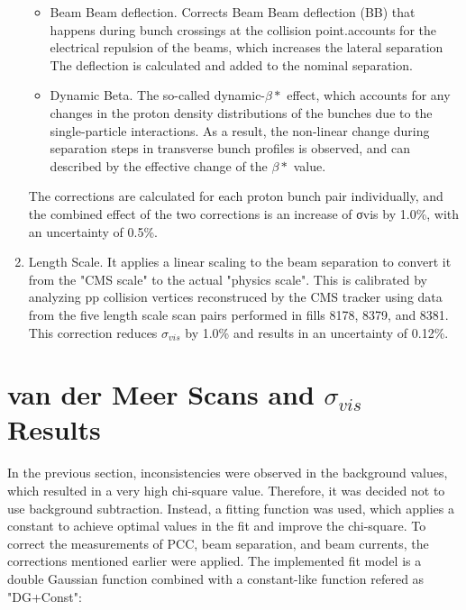 \begin{enumerate}
\begin{itemize}
\item Beam Beam deflection. Corrects Beam Beam deflection (BB) that happens during bunch crossings at the collision point.accounts for the electrical repulsion of the beams, which increases the lateral
separation  The deflection is calculated and added to the nominal separation.

\item Dynamic Beta. The so-called dynamic-$\beta*$ effect, which accounts for any changes in the proton density distributions of the bunches due to the single-particle interactions. As a result, the non-linear change during separation steps in transverse bunch profiles is observed, and can described by the effective change of the $\beta*$  value.
\end{itemize}
The corrections are calculated for each proton bunch pair individually, and the combined effect of the two corrections is an increase of σvis by 1.0\%, with an uncertainty of 0.5\%.

\item Length Scale.  It applies a linear scaling to the beam separation to convert it from the "CMS scale" to the actual "physics scale". This is  calibrated by analyzing pp collision vertices reconstruced by the CMS tracker using data from the five length scale scan pairs performed in fills 8178, 8379, and 8381.%
This correction reduces $\sigma_{vis}$ by 1.0\% and results in an uncertainty of 0.12\%.

\end{enumerate}

\newpage
\section{van der Meer Scans and $\sigma_{vis}$ Results}

In the previous section, inconsistencies were observed in the background values, which resulted in a very high chi-square value. Therefore, it was decided not to use background subtraction. Instead, a fitting function was used, which applies a constant to achieve optimal values in the fit and improve the chi-square. To correct the measurements of PCC, beam separation, and beam currents, the corrections mentioned earlier were applied. The implemented fit model is a double Gaussian function combined with a constant-like function refered as "DG+Const":

